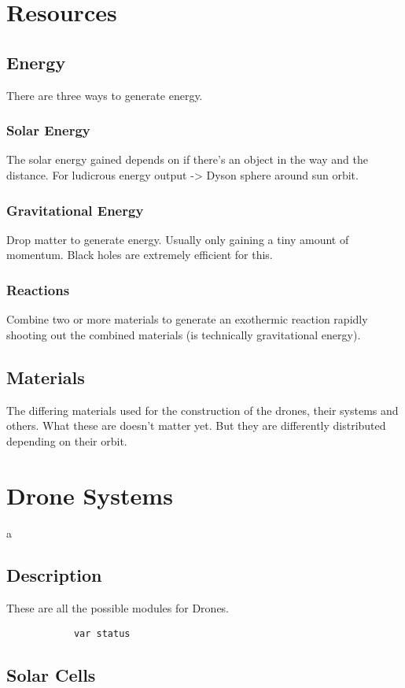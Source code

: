 \documentclass[a4paper]{scrreprt}
\begin{document}
\chapter{Resources}
    \section{Energy}
        There are three ways to generate energy. 
        \subsection{Solar Energy}
            The solar energy gained depends on if there's an object in the way and the distance. For ludicrous energy output -> Dyson sphere around sun orbit.
        \begin{alpha-feature}
            \subsection{Gravitational Energy}
                Drop matter to generate energy. Usually only gaining a tiny amount of momentum.
                Black holes are extremely efficient for this.
        \end{alpha-feature}
        \subsection{Reactions}
        Combine two or more materials to generate an exothermic reaction rapidly shooting out the combined materials (is technically gravitational energy).
    \section{Materials}
        The differing materials used for the construction of the drones, their systems and others. What these are doesn't matter yet. But they are differently distributed depending on their orbit.
\chapter{Drone Systems}
    a\section{Description}
        These are all the possible modules for Drones. 
        \begin{verbatim}
            var status
        \end{verbatim}
    \section{Solar Cells}
\end{document}
